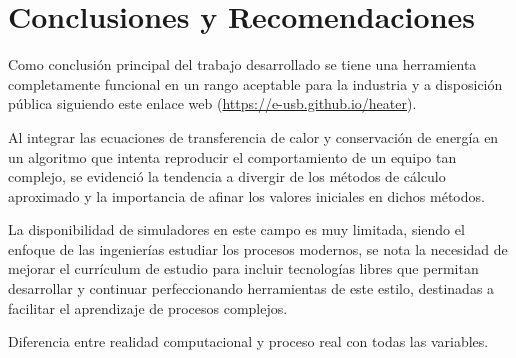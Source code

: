 \chapter*{Conclusiones y Recomendaciones}

\par Como conclusión principal del trabajo desarrollado se tiene una herramienta completamente funcional en un rango aceptable para la industria y a disposición pública siguiendo este enlace web (\url{https://e-usb.github.io/heater}).

\par Al integrar las ecuaciones de transferencia de calor y conservación de energía en un algoritmo que intenta reproducir el comportamiento de un equipo tan complejo, se evidenció la tendencia a divergir de los métodos de cálculo aproximado y la importancia de afinar los valores iniciales en dichos métodos.

\par La disponibilidad de simuladores en este campo es muy limitada, siendo el enfoque de las ingenierías estudiar los procesos modernos, se nota la necesidad de mejorar el currículum de estudio para incluir tecnologías libres que permitan desarrollar y continuar perfeccionando herramientas de este estilo, destinadas a facilitar el aprendizaje de procesos complejos.

Diferencia entre realidad computacional y proceso real con todas las variables.